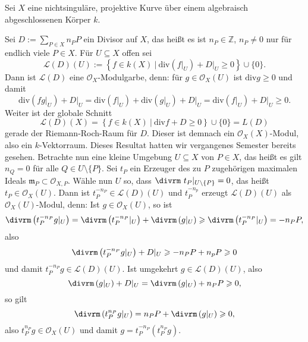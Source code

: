 \documentclass[11pt]{book}
\theoremstyle{nonumberbreak}
\newenvironment{ex}[1][]{\ifthenelse{\equal{#1}{}}{\example}{\example[#1]}\rm}{\endexample}
\begin{document}
\begin{spacing}{1.4}
\begin{ex}    %
Sei $X$ eine nichtsinguläre, projektive Kurve über einem algebraisch abgeschlossenen Körper $k$. 
\begin{compactenum}
\item Sei $D:= \sum_{P \in X} n_P P$ ein Divisor auf $X$, das heißt es ist $n_P \in \mathbb{Z}$, $n_P \neq 0$ nur für endlich viele $P \in X$. Für $U \subseteq X$ offen sei 
$$\mathcal{L}(D)(U) := \left\{ f \in k(X) \ \vert \ \textrm{div} \left(f\vert_U\right) + D\vert_U \geqslant 0 \right\} \cup \{0\}.$$
Dann ist $\mathcal{L}(D)$ eine $\mathcal{O}_X$-Modulgarbe, denn: für $g \in \mathcal{O}_X(U)$ ist $\textrm{div}g \geqslant 0$ und damit
$$\textrm{div} \left(fg \vert_U\right) + D\vert_U = \textrm{div} \left(f\vert_U\right) + \textrm{div}\left(g\vert_U\right) + D\vert_U = \textrm{div}\left(f\vert_U\right) + D\vert_U \geqslant 0.$$
Weiter ist der globale Schnitt
$$\mathcal{L}(D)(X) = \left\{f \in k(X) \ \vert \ \textrm{div}f + D \geqslant 0 \right\} \cup \{0\} = L(D)$$
gerade der Riemann-Roch-Raum für $D$. Dieser ist demnach ein $\mathcal{O}_X(X)$-Modul, also ein $k$-Vektorraum. Dieses Resultat hatten wir vergangenes Semester bereits gesehen. Betrachte nun eine kleine Umgebung $U \subseteq X$ von $P \in X$, das heißt es gilt $n_Q = 0$ für alle $Q \in U \setminus \{P\}$. Sei $t_P$ ein Erzeuger des zu $P$ zugehörigen maximalen Ideals $\mathfrak{m}_P \subset \mathcal{O}_{X,P}$. Wähle nun $U$ so, dass $\divrm \ t_P \vert_{U \setminus \{P\}} =0$, das heißt $t_P \in \mathcal{O}_X(U)$. Dann ist $t_P^{-n_P} \in \mathcal{L}(D)(U)$ und $t_P^{-n_p}$ erzeugt $\mathcal{L}(D)(U)$ als $\mathcal{O}_X(U)$-Modul, denn: Ist $g \in \mathcal{O}_X(U)$, so ist $$\divrm \left(t_P^{-n_P} g \vert_U \right) = \divrm\left(t_P^{-n_P} \vert_U\right) + \divrm \left(g \vert_U\right) \geqslant \divrm \left(t_P^{-n_P} \vert_U\right) = -n_P P,$$
also
$$\divrm \left(t_P^{-n_P} g \vert_U\right) + D\vert_U \geqslant -n_PP + n_pP \geqslant 0$$
und damit $t_P^{-n_P} g \in \mathcal{L}(D)(U)$. Ist umgekehrt $g \in \mathcal{L}(D)(U)$, also $$\divrm \left(g \vert_U\right) + D\vert_U = \divrm\left(g \vert_U\right) + n_P P \geqslant 0,$$
so gilt 
$$\divrm\left(t_P^{n_P} g \vert_U\right) = n_P P + \divrm \left(g \vert_U\right) \geqslant 0,$$
also $t_P^{n_P} g \in \mathcal{O}_X(U)$ und damit $g= t_P^{-n_P} \left( t_P^{n_P} g \right)$.



\end{compactenum}
\end{ex}
\end{spacing}
\end{document}
